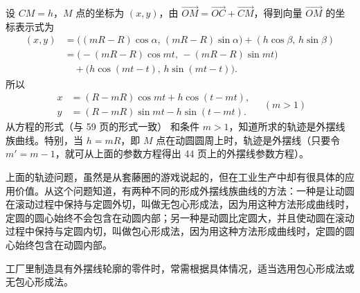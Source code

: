 \noindent
设 $CM=h$，$M$ 点的坐标为 $(x, y)$，由 $\overrightarrow{OM}=\overrightarrow{OC}+\overrightarrow{CM}$，得到向量 $\overrightarrow{OM}$ 的坐标表示式为
\begin{align*}
  (x, y) &= \bigl((mR-R)\cos\alpha,\, (mR-R)\sin\alpha\bigr) + (h\cos\beta,\, h\sin\beta) \\
         &= \bigl(-(mR-R)\cos mt,\, -(mR-R)\sin mt\bigr) \\
         &\quad + \bigl(h\cos(mt-t),\, h\sin(mt-t)\bigr).
\end{align*}
所以
\[
  \begin{aligned}
    x &= (R-mR)\cos mt + h\cos(t-mt), \\
    y &= (R-mR)\sin mt - h\sin(t-mt).
  \end{aligned}
  \quad (m>1)
\]
从方程的形式（与 59 页的形式一致）%
和条件 $m>1$，知道所求的轨迹是外摆线族曲线。特别，当 $h=mR$，即 $M$ 点在动圆圆周上时，轨迹是外摆线（只要令 $m'=m-1$，就可从上面的参数方程得出 44 页上的外摆线参数方程）。%

上面的轨迹问题，虽然是从套藤圈的游戏说起的，但在工业生产中却有很具体的应用价值。从这个问题知道，有两种不同的形成外摆线族曲线的方法：一种是让动圆在滚动过程中保持与定圆外切，叫做无包心形成法，因为用这种方法形成曲线时，定圆的圆心始终不会包含在动圆内部；另一种是动圆比定圆大，并且使动圆在滚动过程中保持与定圆内切，叫做包心形成法，因为用这种方法形成曲线时，定圆的圆心始终包含在动圆内部。

工厂里制造具有外摆线轮廓的零件时，常需根据具体情况，适当选用包心形成法或无包心形成法。
